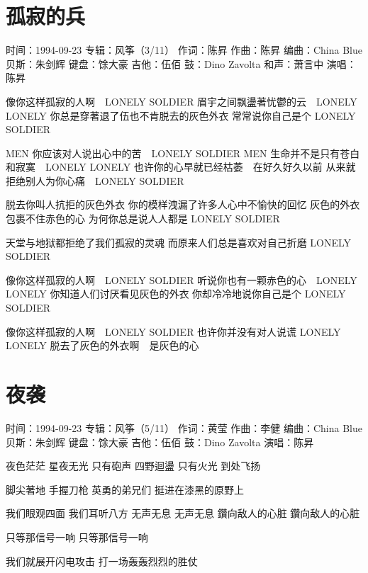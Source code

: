 \documentclass[UTF8,a4paper,oneside,twocolumn,12pt]{ctexbook}
\newcommand{\infopair}[2]{\textbullet #1：#2}
\newcommand{\zc}[1][伍佰]{\infopair{作词}{#1}}
\newcommand{\zq}[1][伍佰]{\infopair{作曲}{#1}}
\newcommand{\bq}[1][伍佰]{\infopair{编曲}{#1}}
\newcommand{\zj}[1]{\infopair{专辑}{#1}}
\newcommand{\sj}[1]{\infopair{时间}{#1}}
\newenvironment{info}{\begin{flushleft}\kaishu
	}
	{\end{flushleft}\normalsize\yahei\par}
\newenvironment{lyric}{
	}
{}
\begin{document}
\section{孤寂的兵}
\begin{info}%
	\sj{1994-09-23}
	\zj{风筝（3/11）}
	\zc[陈昇]
	\zq[陈昇]
	\bq[China Blue]
	\infopair{贝斯}{朱剑辉}
	\infopair{键盘}{馀大豪}
	\infopair{吉他}{伍佰}
	\infopair{鼓}{Dino Zavolta}
	\infopair{和声}{萧言中}
	\infopair{演唱}{陈昇}
\end{info}
\begin{lyric}%
	像你这样孤寂的人啊　LONELY SOLDIER
	眉宇之间飘盪著忧鬱的云　LONELY LONELY
	你总是穿著退了伍也不肯脱去的灰色外衣
	常常说你自己是个 LONELY SOLDIER

	MEN 你应该对人说出心中的苦　LONELY SOLDIER
	MEN 生命并不是只有苍白和寂寞　LONELY LONELY
	也许你的心早就已经枯萎　在好久好久以前
	从来就拒绝别人为你心痛　LONELY SOLDIER

	脱去你叫人抗拒的灰色外衣
	你的模样洩漏了许多人心中不愉快的回忆
	灰色的外衣包裹不住赤色的心
	为何你总是说人人都是 LONELY SOLDIER

	天堂与地狱都拒绝了我们孤寂的灵魂
	而原来人们总是喜欢对自己折磨 LONELY SOLDIER

	像你这样孤寂的人啊　LONELY SOLDIER
	听说你也有一颗赤色的心　LONELY LONELY
	你知道人们讨厌看见灰色的外衣
	你却冷冷地说你自己是个 LONELY SOLDIER

	像你这样孤寂的人啊　LONELY SOLDIER
	也许你并没有对人说谎 LONELY LONELY
	脱去了灰色的外衣啊　是灰色的心
\end{lyric}

\section{夜袭}
\begin{info}%
	\sj{1994-09-23}
	\zj{风筝（5/11）}
	\zc[黄莹]
	\zq[李健]
	\bq[China Blue]
	\infopair{贝斯}{朱剑辉}
	\infopair{键盘}{馀大豪}
	\infopair{吉他}{伍佰}
	\infopair{鼓}{Dino Zavolta}
	\infopair{演唱}{陈昇}
\end{info}
\begin{lyric}%
	夜色茫茫 星夜无光
	只有砲声 四野迴盪
	只有火光 到处飞扬

	脚尖著地 手握刀枪
	英勇的弟兄们 挺进在漆黑的原野上

	我们眼观四面 我们耳听八方
	无声无息 无声无息
	鑽向敌人的心脏 鑽向敌人的心脏

	只等那信号一响
	只等那信号一响

	我们就展开闪电攻击
	打一场轰轰烈烈的胜仗
\end{lyric}
\end{document}
